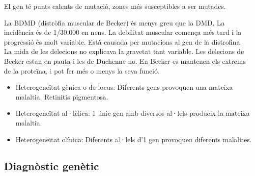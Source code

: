 El gen té punts calents de mutació, zones més susceptibles a ser mutades.

La BDMD (distròfia muscular de Becker) és menys greu que la DMD. La incidència és de 1/30.000 en nens. La debilitat muscular comença més tard i la progressió és molt variable. Està causada per mutacions al gen de la distrofina. La mida de les delecions no explicava la gravetat tant variable. Les delecions de Becker estan en pauta i les de Duchenne no. En Becker es mantenen els extrems de la proteïna, i pot fer més o menys la seva funció.

\begin{itemize}
\item Heterogeneïtat gènica o de locus: Diferents gens provoquen una mateixa malaltia. Retinitis pigmentosa.
  
\item Heterogeneïtat al·lèlica: 1 únic gen amb diversos al·lels produeix la mateixa malaltia.
  
\item Heterogeneïtat clínica: Diferents al·lels d'1 gen provoquen diferents malalties.
\end{itemize}

\subsection{Diagnòstic genètic}
